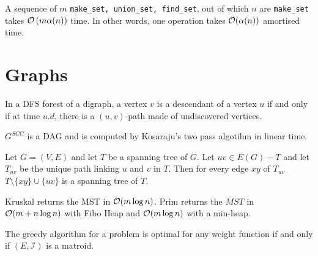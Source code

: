 \documentclass[10pt]{cours}
\begin{document}
\begin{theorem}
    A sequence of $m$ \texttt{make\_set, union\_set, find\_set}, out of which $n$ are \texttt{make\_set} takes $\mathcal{O}\left(m \alpha(n)\right)$ time. In other words, one operation takes $\mathcal{O}(\alpha(n))$ amortised time.
\end{theorem}

\section{Graphs}
\begin{theorem}
    In a DFS forest of a digraph, a vertex $v$ is a descendant of a vertex $u$ if and only if at time $u.d$, there is a $(u, v)$-path made of undiscovered vertices.
\end{theorem}

\begin{proposition}
    $G^{SCC}$ is a DAG and is computed by Kosaraju's two pass algotihm in linear time. 
\end{proposition}

\begin{proposition}
    Let $G = (V, E)$ and let $T$ be a spanning tree of $G$. Let $uv \in E(G) - T$ and let $T_{uv}$ be the unique path linking $u$ and $v$ in $T$. Then for every edge $xy$ of $T_{uv}$ $T\setminus \{xy\} \cup \{uv\}$ is a spanning tree of $T$.
\end{proposition}

\begin{theorem}
    Kruskal returns the MST in $\mathcal{O}(m\log n)$. Prim returns the $MST$ in $\mathcal{O}(m + n\log n)$ with Fibo Heap and $\mathcal{O}(m\log n)$ with a min-heap. 
\end{theorem}

\begin{theorem}
    The greedy algorithm for a problem is optimal for any weight function if and only if $(E, \mathcal{I})$ is a matroid. 
\end{theorem}
\end{document}
